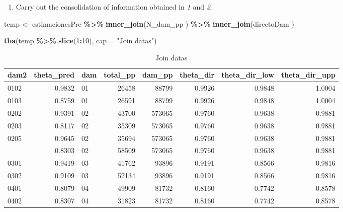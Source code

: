 \documentclass[
  12pt,
]{book}
\newenvironment{Shaded}{\begin{snugshade}}{\end{snugshade}}
\newcommand{\AttributeTok}[1]{\textcolor[rgb]{0.13,0.29,0.53}{#1}}
\newcommand{\DecValTok}[1]{\textcolor[rgb]{0.00,0.00,0.81}{#1}}
\newcommand{\FunctionTok}[1]{\textcolor[rgb]{0.13,0.29,0.53}{\textbf{#1}}}
\newcommand{\NormalTok}[1]{#1}
\newcommand{\OtherTok}[1]{\textcolor[rgb]{0.56,0.35,0.01}{#1}}
\newcommand{\SpecialCharTok}[1]{\textcolor[rgb]{0.81,0.36,0.00}{\textbf{#1}}}
\newcommand{\StringTok}[1]{\textcolor[rgb]{0.31,0.60,0.02}{#1}}
\providecommand{\tightlist}{%
  \setlength{\itemsep}{0pt}\setlength{\parskip}{0pt}}
\begin{document}
\begin{enumerate}
\def\labelenumi{\arabic{enumi}.}
\setcounter{enumi}{2}
\tightlist
\item
  Carry out the consolidation of information obtained in \emph{1} and \emph{2}.
\end{enumerate}

\begin{Shaded}
\begin{Highlighting}[]
\NormalTok{temp }\OtherTok{\textless{}{-}}\NormalTok{ estimacionesPre }\SpecialCharTok{\%\textgreater{}\%}
  \FunctionTok{inner\_join}\NormalTok{(N\_dam\_pp ) }\SpecialCharTok{\%\textgreater{}\%} 
  \FunctionTok{inner\_join}\NormalTok{(directoDam )}

\FunctionTok{tba}\NormalTok{(temp }\SpecialCharTok{\%\textgreater{}\%} \FunctionTok{slice}\NormalTok{(}\DecValTok{1}\SpecialCharTok{:}\DecValTok{10}\NormalTok{), }\AttributeTok{cap =} \StringTok{"Join datas"}\NormalTok{)}
\end{Highlighting}
\end{Shaded}

\begin{table}[H]

\caption{\label{tab:unnamed-chunk-20}Join datas}
\centering
\begin{tabular}[t]{lrlrrrrr}
\toprule
dam2 & theta\_pred & dam & total\_pp & dam\_pp & theta\_dir & theta\_dir\_low & theta\_dir\_upp\\
\midrule
0102 & 0.9832 & 01 & 26458 & 88799 & 0.9926 & 0.9848 & 1.0004\\
0103 & 0.8759 & 01 & 26591 & 88799 & 0.9926 & 0.9848 & 1.0004\\
0202 & 0.9391 & 02 & 43700 & 573065 & 0.9760 & 0.9638 & 0.9881\\
0203 & 0.8117 & 02 & 35309 & 573065 & 0.9760 & 0.9638 & 0.9881\\
0205 & 0.9645 & 02 & 35694 & 573065 & 0.9760 & 0.9638 & 0.9881\\
\addlinespace
0212 & 0.8303 & 02 & 58509 & 573065 & 0.9760 & 0.9638 & 0.9881\\
0301 & 0.9419 & 03 & 41762 & 93896 & 0.9191 & 0.8566 & 0.9816\\
0302 & 0.9109 & 03 & 52134 & 93896 & 0.9191 & 0.8566 & 0.9816\\
0401 & 0.8079 & 04 & 49909 & 81732 & 0.8160 & 0.7742 & 0.8578\\
0402 & 0.8307 & 04 & 31823 & 81732 & 0.8160 & 0.7742 & 0.8578\\
\bottomrule
\end{tabular}
\end{table}
\end{document}
